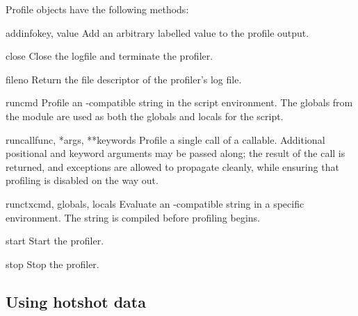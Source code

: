 Profile objects have the following methods:

\begin{methoddesc}{addinfo}{key, value}
Add an arbitrary labelled value to the profile output.
\end{methoddesc}

\begin{methoddesc}{close}{}
Close the logfile and terminate the profiler.
\end{methoddesc}

\begin{methoddesc}{fileno}{}
Return the file descriptor of the profiler's log file.
\end{methoddesc}

\begin{methoddesc}{run}{cmd}
Profile an -compatible string in the script environment.
The globals from the  module are used as
both the globals and locals for the script.
\end{methoddesc}

\begin{methoddesc}{runcall}{func, *args, **keywords}
Profile a single call of a callable.
Additional positional and keyword arguments may be passed
along; the result of the call is returned, and exceptions are
allowed to propagate cleanly, while ensuring that profiling is
disabled on the way out.
\end{methoddesc}


\begin{methoddesc}{runctx}{cmd, globals, locals}
Evaluate an -compatible string in a specific environment.
The string is compiled before profiling begins.
\end{methoddesc}

\begin{methoddesc}{start}{}
Start the profiler.
\end{methoddesc}

\begin{methoddesc}{stop}{}
Stop the profiler.
\end{methoddesc}


\subsection{Using hotshot data}



